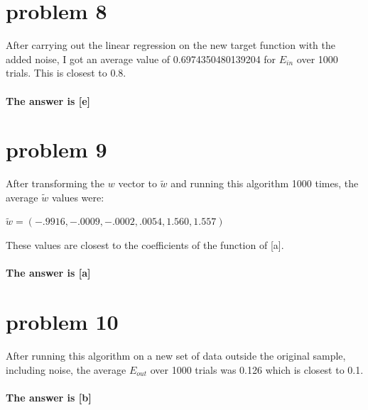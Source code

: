 \documentclass{article}
\begin{document}
\section*{problem 8} 
After carrying out the linear regression on the new target function with the added noise, I got an average value of 0.6974350480139204 for $E_{in}$ over 1000 trials. This is closest to 0.8.\\\\
\textbf{The answer is [e]}

\section*{problem 9}
After transforming the $w$ vector to $\tilde{w}$ and running this algorithm 1000 times, the average $\tilde{w}$ values were:
\begin{center}
    $\tilde{w} = (-.9916, -.0009, -.0002, .0054, 1.560, 1.557)$
\end{center}
These values are closest to the coefficients of the function of [a].\\\\
\textbf{The answer is [a]}

\section*{problem 10}
After running this algorithm on a new set of data outside the original sample, including noise, the average $E_{out}$ over 1000 trials was 0.126 which is closest to 0.1.\\\\
\textbf{The answer is [b]}
\end{document}

